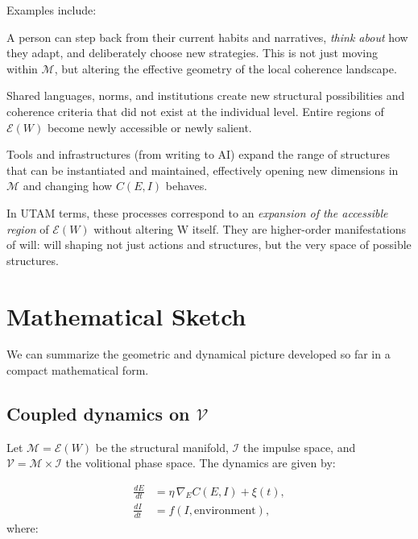\documentclass[12pt,a4paper]{report}
\newcommand{\Will}{W}
\begin{document}
Examples include:

\begin{description}[leftmargin=2em]
    \item[Conscious reflection.] A person can step back from their current habits and narratives, \emph{think about} how they adapt, and deliberately choose new strategies. This is not just moving within \(\mathcal{M}\), but altering the effective geometry of the local coherence landscape.
    \item[Cultural evolution.] Shared languages, norms, and institutions create new structural possibilities and coherence criteria that did not exist at the individual level. Entire regions of \(\mathcal{E}(\Will)\) become newly accessible or newly salient.
    \item[Technological innovation.] Tools and infrastructures (from writing to AI) expand the range of structures that can be instantiated and maintained, effectively opening new dimensions in \(\mathcal{M}\) and changing how \(C(E, I)\) behaves.
\end{description}

In UTAM terms, these processes correspond to an \emph{expansion of the accessible region} of \(\mathcal{E}(\Will)\) without altering \Will{} itself. They are higher-order manifestations of will: will shaping not just actions and structures, but the very space of possible structures.

\section{Mathematical Sketch}

We can summarize the geometric and dynamical picture developed so far in a compact mathematical form.

\subsection*{Coupled dynamics on \(\mathcal{V}\)}

Let \(\mathcal{M} = \mathcal{E}(\Will)\) be the structural manifold, \(\mathcal{I}\) the impulse space, and \(\mathcal{V} = \mathcal{M} \times \mathcal{I}\) the volitional phase space. The dynamics are given by:

\begin{align}
    \frac{dE}{dt} &= \eta \, \nabla_E C(E, I) + \xi(t),
    \label{eq:coupled-dE}\\[0.5em]
    \frac{dI}{dt} &= f(I, \text{environment}),
    \label{eq:coupled-dI}
\end{align}
where:
\end{document}
